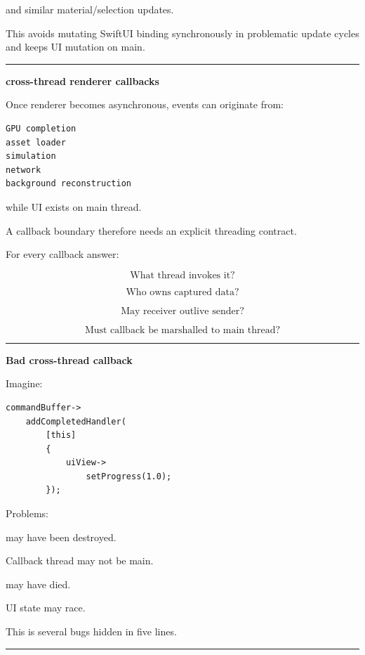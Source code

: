 and similar material/selection updates.

This avoids mutating SwiftUI binding synchronously in problematic update cycles and keeps UI mutation on main.

\begin{center}\rule{0.5\linewidth}{0.5pt}\end{center}

\textbf{cross-thread renderer callbacks}

Once renderer becomes asynchronous, events can originate from:

\begin{verbatim}
GPU completion
asset loader
simulation
network
background reconstruction
\end{verbatim}

while UI exists on main thread.

A callback boundary therefore needs an explicit threading contract.

For every callback answer:

\[
\boxed{
\text{What thread invokes it?}
}
\]

\[
\boxed{
\text{Who owns captured data?}
}
\]

\[
\boxed{
\text{May receiver outlive sender?}
}
\]

\[
\boxed{
\text{Must callback be marshalled to main thread?}
}
\]

\begin{center}\rule{0.5\linewidth}{0.5pt}\end{center}

\textbf{Bad cross-thread callback}

Imagine:

\begin{verbatim}
commandBuffer->
    addCompletedHandler(
        [this]
        {
            uiView->
                setProgress(1.0);
        });
\end{verbatim}

Problems:

 may have been destroyed.

Callback thread may not be main.

 may have died.

UI state may race.

This is several bugs hidden in five lines.

\begin{center}\rule{0.5\linewidth}{0.5pt}\end{center}

